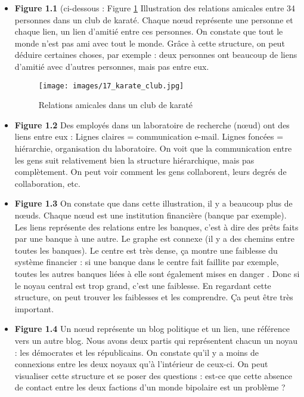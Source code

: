 \begin{itemize}

	\item \textbf{Figure 1.1} (ci-dessous : Figure \ref{karate} Illustration des relations amicales entre 34 personnes dans un club de karaté.
Chaque nœud représente une personne et chaque lien, un lien d'amitié entre ces personnes.
On constate que tout le monde n'est pas ami avec tout le monde. Grâce à cette structure, on peut déduire certaines choses, par exemple : deux personnes ont beaucoup de liens d'amitié avec d'autres personnes, mais pas entre eux.

\begin{figure}[!h]
\centering
\texttt{[image: images/17\_karate\_club.jpg]}
\label{karate}
\caption{Relations amicales dans un club de karaté}
\end{figure}

	\item \textbf{Figure 1.2} Des employés dans un laboratoire de recherche (nœud) ont des liens entre eux :
Lignes claires = communication e-mail.
Lignes foncées = hiérarchie, organisation du laboratoire.
On voit que la communication entre les gens suit relativement bien la structure hiérarchique, mais pas complètement. On peut voir comment les gens collaborent, leurs degrés de collaboration, etc.

	\item \textbf{Figure 1.3} On constate que dans cette illustration, il y a beaucoup plus de nœuds. Chaque nœud est une institution financière (banque par exemple). Les liens représente des relations entre les banques, c'est à dire des prêts faits par une banque à une autre. Le graphe est connexe (il y a des chemins entre toutes les banques). Le centre est très dense, ça montre une faiblesse du système financier : si une banque dans le centre fait faillite par exemple, toutes les autres banques liées à elle sont également mises en danger . Donc si le noyau central est trop grand, c'est une faiblesse. En regardant cette structure, on peut trouver les faiblesses et les comprendre. Ça peut être très important.

	\item \textbf{Figure 1.4} Un nœud représente un blog politique et un lien, une référence vers un autre blog. Nous avons deux partis qui représentent chacun un noyau : les démocrates et les républicains. On constate qu'il y a moins de connexions entre les deux noyaux qu'à l'intérieur de ceux-ci. On peut visualiser cette structure et se poser des questions : est-ce que cette absence de contact entre les deux factions d'un monde bipolaire est un problème ?
\end{itemize}

